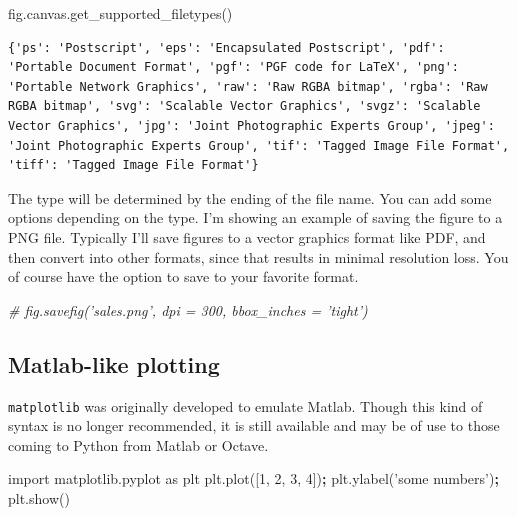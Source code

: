 \documentclass[
  letterpaper,
]{scrbook}
\newenvironment{Shaded}{\begin{snugshade}}{\end{snugshade}}
\newcommand{\CommentTok}[1]{\textcolor[rgb]{0.56,0.35,0.01}{\textit{#1}}}
\newcommand{\DecValTok}[1]{\textcolor[rgb]{0.00,0.00,0.81}{#1}}
\newcommand{\ImportTok}[1]{#1}
\newcommand{\NormalTok}[1]{#1}
\newcommand{\OperatorTok}[1]{\textcolor[rgb]{0.81,0.36,0.00}{\textbf{#1}}}
\newcommand{\StringTok}[1]{\textcolor[rgb]{0.31,0.60,0.02}{#1}}
\begin{document}
\begin{Shaded}
\begin{Highlighting}[]
\NormalTok{fig.canvas.get_supported_filetypes()}
\end{Highlighting}
\end{Shaded}

\begin{verbatim}
{'ps': 'Postscript', 'eps': 'Encapsulated Postscript', 'pdf': 'Portable Document Format', 'pgf': 'PGF code for LaTeX', 'png': 'Portable Network Graphics', 'raw': 'Raw RGBA bitmap', 'rgba': 'Raw RGBA bitmap', 'svg': 'Scalable Vector Graphics', 'svgz': 'Scalable Vector Graphics', 'jpg': 'Joint Photographic Experts Group', 'jpeg': 'Joint Photographic Experts Group', 'tif': 'Tagged Image File Format', 'tiff': 'Tagged Image File Format'}
\end{verbatim}

The type will be determined by the ending of the file name. You can add some options depending on the type. I'm showing an example of saving the figure to a PNG file. Typically I'll save figures to a vector graphics format like PDF, and then convert into other formats, since that results in minimal resolution loss. You of course have the option to save to your favorite format.

\begin{Shaded}
\begin{Highlighting}[]
\CommentTok{# fig.savefig('sales.png', dpi = 300, bbox_inches = 'tight') }
\end{Highlighting}
\end{Shaded}

\hypertarget{matlab-like-plotting}{%
\subsection{Matlab-like plotting}\label{matlab-like-plotting}}

\texttt{matplotlib} was originally developed to emulate Matlab. Though this kind of syntax is no longer recommended, it is still available and may be of use to those coming to Python from Matlab or Octave.

\begin{Shaded}
\begin{Highlighting}[]
\ImportTok{import}\NormalTok{ matplotlib.pyplot }\ImportTok{as}\NormalTok{ plt}
\NormalTok{plt.plot([}\DecValTok{1}\NormalTok{, }\DecValTok{2}\NormalTok{, }\DecValTok{3}\NormalTok{, }\DecValTok{4}\NormalTok{])}\OperatorTok{;}
\NormalTok{plt.ylabel(}\StringTok{'some numbers'}\NormalTok{)}\OperatorTok{;}
\NormalTok{plt.show()}
\end{Highlighting}
\end{Shaded}
\end{document}
